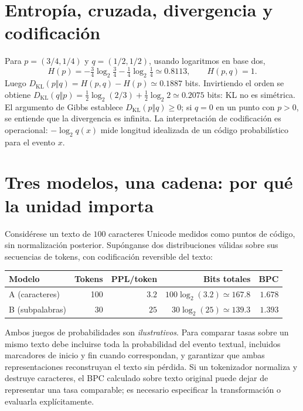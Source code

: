 \section*{Entropía, cruzada, divergencia y codificación}
Para $p=(3/4,1/4)$ y $q=(1/2,1/2)$, usando logaritmos en base dos,
\[
H(p)=-\tfrac34\log_2\tfrac34-\tfrac14\log_2\tfrac14\simeq0.8113,
\qquad H(p,q)=1.
\]
Luego $D_{\mathrm{KL}}(p\Vert q)=H(p,q)-H(p)\simeq0.1887$ bits.
Invirtiendo el orden se obtiene
$D_{\mathrm{KL}}(q\Vert p)=\frac12\log_2(2/3)+\frac12\log_2 2
\simeq0.2075$ bits: KL no es simétrica.
El argumento de Gibbs establece $D_{\mathrm{KL}}(p\Vert q)\geq0$;
si $q=0$ en un punto con $p>0$, se entiende que la divergencia es infinita.
La interpretación de codificación es operacional: $-\log_2 q(x)$ mide
longitud idealizada de un código probabilístico para el evento $x$.

\section*{Tres modelos, una cadena: por qué la unidad importa}
Considérese un texto de $100$ caracteres Unicode medidos como puntos de
código, sin normalización posterior. Supónganse dos distribuciones válidas
sobre sus secuencias de tokens, con codificación reversible del texto:
\begin{center}
\begin{tabular}{lrrrr}\toprule
Modelo & Tokens & PPL/token & Bits totales & BPC\\\midrule
A (caracteres) &100& $3.2$ & $100\log_2(3.2)\simeq167.8$ & $1.678$\\
B (subpalabras)&30& $25$ & $30\log_2(25)\simeq139.3$ & $1.393$\\\bottomrule
\end{tabular}
\end{center}
Ambos juegos de probabilidades son \emph{ilustrativos}. Para comparar tasas
sobre un mismo texto debe incluirse toda la probabilidad del evento textual,
incluidos marcadores de inicio y fin cuando correspondan, y garantizar que
ambas representaciones reconstruyan el texto sin pérdida. Si un tokenizador
normaliza y destruye caracteres, el BPC calculado sobre texto original
puede dejar de representar una tasa comparable; es necesario especificar
la transformación o evaluarla explícitamente.

